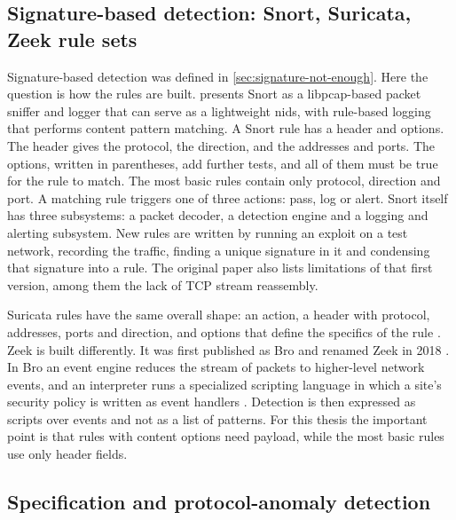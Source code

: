 \subsection{Signature-based detection: Snort, Suricata, Zeek rule sets}
\label{sec:signature-rulesets}

Signature-based detection was defined in \cref{sec:signature-not-enough}.
Here the question is how the rules are built. \citet{roesch1999snort}
presents Snort as a libpcap-based packet sniffer and logger that can serve as
a lightweight \gls{nids}, with rule-based logging that performs content
pattern matching. A Snort rule has a header and options. The header gives the
protocol, the direction, and the addresses and ports. The options, written in
parentheses, add further tests, and all of them must be true for the rule to
match. The most basic rules contain only protocol, direction and port. A
matching rule triggers one of three actions: pass, log or alert. Snort itself
has three subsystems: a packet decoder, a detection engine and a logging and
alerting subsystem. New rules are written by running an exploit on a test
network, recording the traffic, finding a unique signature in it and
condensing that signature into a rule. The original paper also lists
limitations of that first version, among them the lack of TCP stream
reassembly.

Suricata rules have the same overall shape: an action, a header with
protocol, addresses, ports and direction, and options that define the
specifics of the rule \citep{suricata2026rules}. Zeek is built differently.
It was first published as Bro \citep{paxson1998bro} and renamed Zeek in 2018
\citep{zeek2018rename}. In Bro an event engine reduces the stream of packets
to higher-level network events, and an interpreter runs a specialized
scripting language in which a site's security policy is written as event
handlers \citep{paxson1998bro}. Detection is then expressed as scripts over
events and not as a list of patterns. For this thesis the important point is
that rules with content options need payload, while the most basic rules use
only header fields.

\subsection{Specification and protocol-anomaly detection}
\label{sec:specification-protocol-anomaly}

